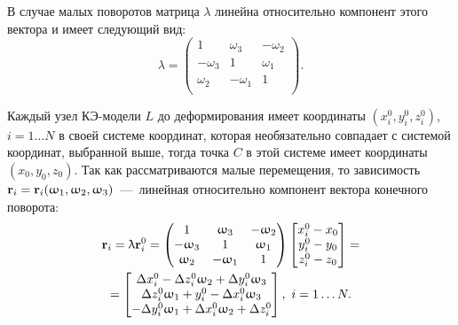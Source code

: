 В случае малых поворотов матрица $ \lambda $ линейна относительно компонент этого вектора и имеет следующий вид:
\begin{equation}
	\lambda =
	\begin{pmatrix}
		1 & \omega_3 & -\omega_2 \\
		-\omega_3 & 1 & \omega_1 \\
		\omega_2 & -\omega_1 & 1 \\
	\end{pmatrix}.
\end{equation}

Каждый узел КЭ-модели $ L $ до деформирования имеет координаты $ (x_i^0, y_i^0, z_i^0) $, $ i = 1 \hdots N $ в своей системе координат, которая необязательно совпадает с системой координат, выбранной выше, тогда точка $ C $ в этой системе имеет координаты $ (x_0, y_0, z_0) $. Так как рассматриваются малые перемещения, то зависимость $ \mathbf{r}_i = \mathbf{r}_i (\upomega_1, \upomega_2, \upomega_3) $~---~линейная относительно компонент вектора конечного поворота:
\begin{gather}
    \mathbf{r}_i = \uplambda \mathbf{r}_i^0 =
    \begin{pmatrix}
    1 & \upomega_3 & -\upomega_2 \\
    -\upomega_3 & 1 & \upomega_1 \\
    \upomega_2 & -\upomega_1 & 1 \\
    \end{pmatrix}
    \begin{bmatrix}
        x_i^0 - x_0 \\
        y_i^0 - y_0 \\
        z_i^0 - z_0 \\
    \end{bmatrix} = \nonumber \\
    = \begin{bmatrix}
    \Delta x_i^0 - \Delta z_i^0 \upomega_2 + \Delta y_i^0 \upomega_3 \\
    \Delta z_i^0 \upomega_1 + y_i^0 - \Delta x_i^0 \upomega_3 \\
    -\Delta y_i^0 \upomega_1 + \Delta x_i^0 \upomega_2 + \Delta z_i^0 \\
    \end{bmatrix}
    , \ i = 1 \hdots N.
    \label{eq:rotVecLin}
\end{gather}

